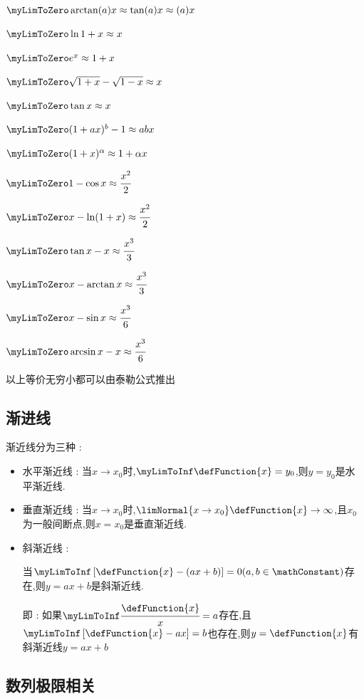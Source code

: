 {{{    $\myLimToZero \arctan(a)x \approx \tan(a)x \approx (a)x$

    $\myLimToZero \ln1+x \approx x$

    $\myLimToZero e^x \approx 1+x$

    $\myLimToZero \sqrt{1 + x} - \sqrt{1 - x} \approx x$

    $\myLimToZero \tan{x} \approx x$

    $\myLimToZero (1 + ax)^b - 1 \approx abx$

    $\myLimToZero (1+x)^\alpha \approx 1+\alpha x$

    $\myLimToZero 1 - \cos x \approx \cfrac{x^2}{2}$

    $\myLimToZero x - \ln(1 + x) \approx \cfrac{x^2}{2}$

    $\myLimToZero \tan x - x \approx \cfrac{x^3}{3}$

    $\myLimToZero x - \arctan x \approx \cfrac{x^3}{3}$

    $\myLimToZero x - \sin x \approx \cfrac{x^3}{6}$

    $\myLimToZero \arcsin x - x \approx \cfrac{x^3}{6}$

    以上等价无穷小都可以由泰勒公式推出
  }%

  \subsection{渐进线}{
    渐近线分为三种 :
    \begin{itemize}
      \item 水平渐近线 : 当$x \to x_0$时,$\myLimToInf\defFunction{x} = y_0$,则$y = y_0$是水平渐近线.
      \item 垂直渐近线 : 当$x \to x_0$时,$\limNormal{x \to x_0}\defFunction{x} \to \infty$,且$x_0$为一般间断点,则$x = x_0$是垂直渐近线.
      \item {
            斜渐近线 :

            当$\myLimToInf\left[\defFunction{x} - (ax + b)\right] = 0(a,b \in \mathConstant)$存在,则$y = ax + b$是斜渐近线.

            即 : 如果$\myLimToInf\cfrac{\defFunction{x}}{x} = a$存在,且$\myLimToInf\left[\defFunction{x} - ax\right] = b$也存在,则$y = \defFunction{x}$有斜渐近线$y = ax + b$
            }
    \end{itemize}
  }%

  \subsection{数列极限相关}{

}}}

